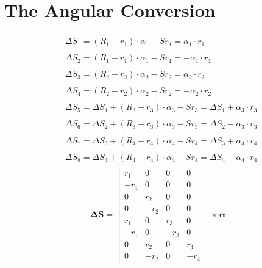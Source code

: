 \section*{The Angular Conversion}
\label{sec:angle_convert}
\begin{align}
    &\begin{aligned}
        \Delta S_1=(R_1+r_1)\cdot\alpha_1-Sr_1 = \alpha_1\cdot r_1
    \end{aligned} \nonumber
    \\
    &\begin{aligned}
        \Delta S_2=(R_1-r_1)\cdot\alpha_1-Sr_1 = -\alpha_1\cdot r_1
    \end{aligned} 
    \nonumber \\
    &\begin{aligned} 
        \Delta S_3=(R_2+r_2)\cdot\alpha_2-Sr_2 = \alpha_2\cdot r_2
    \end{aligned} \nonumber
    \\
    &\begin{aligned}
        \Delta S_4=(R_2-r_2)\cdot\alpha_2-Sr_2 = -\alpha_2\cdot r_2
    \end{aligned}
    \nonumber \\
    &\begin{aligned}
        \Delta S_5= \Delta S_1+ (R_3+r_3)\cdot\alpha_3-Sr_3 = \Delta S_1+\alpha_3\cdot r_3
    \end{aligned} \nonumber
    \\
    &\begin{aligned}
        \Delta S_6= \Delta S_2 + (R_3-r_3)\cdot\alpha_3-Sr_3 = \Delta S_2-\alpha_3\cdot r_3
    \end{aligned}
    \nonumber \\
    &\begin{aligned} 
        \Delta S_7=\Delta S_3+(R_4+r_4)\cdot\alpha_4-Sr_4 = \Delta S_3+\alpha_4\cdot r_4
    \end{aligned} \nonumber
    \\
    &\begin{aligned}
        \Delta S_8=\Delta S_4+(R_4-r_4)\cdot\alpha_4-Sr_4 = \Delta S_4-\alpha_4\cdot r_4
    \end{aligned}
    \label{eq:deltaS}
\end{align}
\begin{align}
    \boldsymbol{\Delta S} = 
    \begin{bmatrix}
        r_1&0&0&0\\
        -r_1&0&0&0\\
        0&r_2&0&0\\
        0&-r_2&0&0\\
        r_1&0&r_3&0\\
        -r_1&0&-r_3&0\\
        0&r_2&0&r_4\\
        0&-r_2&0&-r_4
    \end{bmatrix}
    \times
    \boldsymbol{\alpha}
    \label{eq:deltaS_matrix}
\end{align}

\newpage